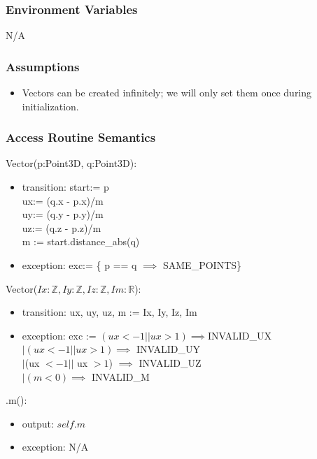 \documentclass[12pt, titlepage]{article}
\begin{document}
\subsubsection{Environment Variables}
N/A

\subsubsection{Assumptions}
\begin{itemize}
	\item Vectors can be created infinitely; we will only set them once during 
	initialization.			
\end{itemize}

\subsubsection{Access Routine Semantics}
\noindent Vector(p:Point3D, q:Point3D):
\begin{itemize}
	\item transition: start:= p\\
	ux:= (q.x - p.x)/m \\
	uy:= (q.y - p.y)/m \\
	uz:= (q.z - p.z)/m \\
	m := start.distance\_abs(q)\\
	\item exception: exc:= \{ p == q $\implies$ SAME\_POINTS\}
\end{itemize}

\noindent Vector($Ix: \mathbb{Z}, Iy: \mathbb{Z}, Iz: \mathbb{Z}, Im: 
\mathbb{R} 
$):
\begin{itemize}
	\item transition: ux, uy, uz, m := Ix, Iy, Iz, Im
	\item exception: exc := $(ux < -1 || ux > 1) \implies $INVALID\_UX \\
	$ | (ux < -1 || ux > 1) \implies$  INVALID\_UY \\ $| $(ux $< -1 ||$ ux $> 
	1$) $\implies $ INVALID\_UZ \\ $| (m < 0) \implies$ INVALID\_M
\end{itemize}

\noindent .m():
\begin{itemize}
	\item output: $self.m$
	\item exception: N/A
\end{itemize}
\end{document}
